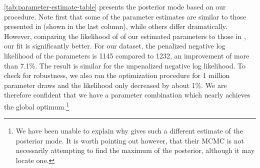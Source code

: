 \documentclass[11pt]{article}
\begin{document}
\autoref{tab:parameter-estimate-table} presents the posterior mode based
on our procedure. Note first that some of the parameter estimates are
similar to those presented in \citet{SmetsWouters2007} (shown in the
last column), while others differ dramatically. However, comparing the
likelihood of of our estimated parameters to those in
\citet{SmetsWouters2007}, our fit is significantly better. For our
dataset, the penalized negative log likelihood of the parameters is 1145
compared to 1232, an improvement of more than 7.1\%. The result is
similar for the unpenalized negative log likelihood. To check for
robustness, we also ran the optimization procedure for 1 million
parameter draws and the likelihood only decreased by about 1\%. We are
therefore confident that we have a parameter combination which nearly
achieves the global optimum.\footnote{We have been unable to explain why
  \citet{SmetsWouters2007} gives such a different estimate of the
  posterior mode. It is worth pointing out however, that their MCMC is
  not necessarily attempting to find the maximum of the posterior,
  although it may locate one.}
\end{document}
